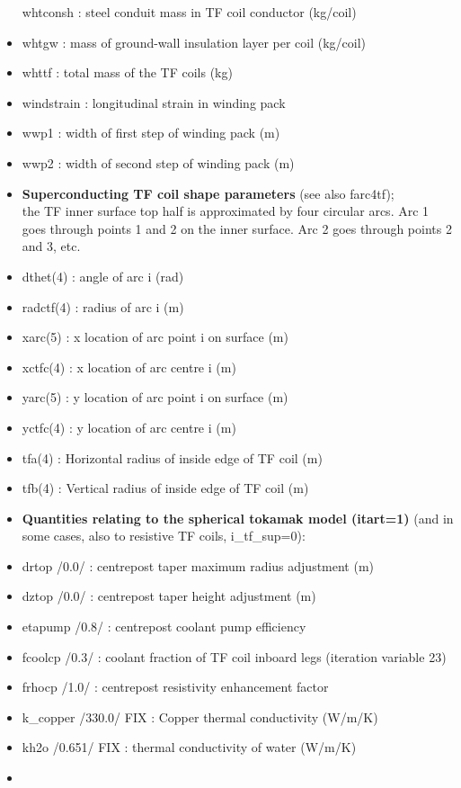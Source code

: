 \documentclass[]{article}
\begin{document}
\begin{itemize}
  whtconsh : steel conduit mass in TF coil conductor (kg/coil)
\item
  whtgw : mass of ground-wall insulation layer per coil (kg/coil)
\item
  whttf : total mass of the TF coils (kg)
\item
  windstrain : longitudinal strain in winding pack
\item
  wwp1 : width of first step of winding pack (m)
\item
  wwp2 : width of second step of winding pack (m)
\item
  \textbf{Superconducting TF coil shape parameters} (see also
  farc4tf);\\
  the TF inner surface top half is approximated by four circular arcs.
  Arc 1 goes through points 1 and 2 on the inner surface. Arc 2 goes
  through points 2 and 3, etc.
\item
  dthet(4) : angle of arc i (rad)
\item
  radctf(4) : radius of arc i (m)
\item
  xarc(5) : x location of arc point i on surface (m)
\item
  xctfc(4) : x location of arc centre i (m)
\item
  yarc(5) : y location of arc point i on surface (m)
\item
  yctfc(4) : y location of arc centre i (m)
\item
  tfa(4) : Horizontal radius of inside edge of TF coil (m)
\item
  tfb(4) : Vertical radius of inside edge of TF coil (m)
\item
  \textbf{Quantities relating to the spherical tokamak model (itart=1)}
  (and in some cases, also to resistive TF coils, i_tf_sup=0):
\item
  drtop /0.0/ : centrepost taper maximum radius adjustment (m)
\item
  dztop /0.0/ : centrepost taper height adjustment (m)
\item
  etapump /0.8/ : centrepost coolant pump efficiency
\item
  fcoolcp /0.3/ : coolant fraction of TF coil inboard legs (iteration
  variable 23)
\item
  frhocp /1.0/ : centrepost resistivity enhancement factor
\item
  k\_copper /330.0/ FIX : Copper thermal conductivity (W/m/K)
\item
  kh2o /0.651/ FIX : thermal conductivity of water (W/m/K)
\item

\end{itemize}
\end{document}
